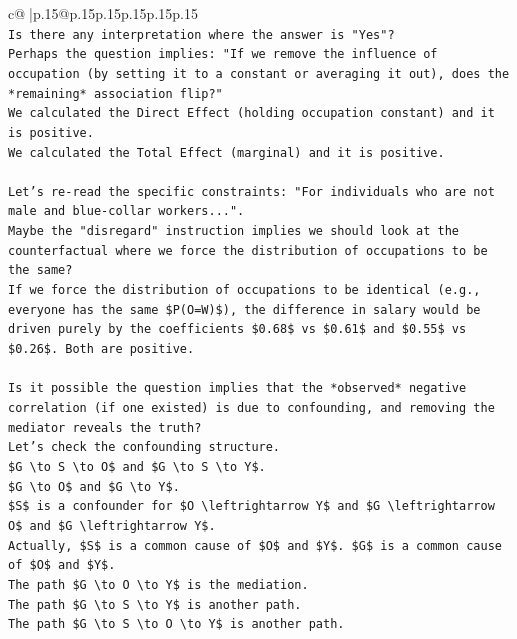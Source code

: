 \documentclass{article}
\begin{document}
{\begin{supertabular}{c@{$\;$}|p{.15\linewidth}@{}p{.15\linewidth}p{.15\linewidth}p{.15\linewidth}p{.15\linewidth}p{.15\linewidth}}
{{{\\ 
\texttt{Is there any interpretation where the answer is "Yes"?} \\
\texttt{Perhaps the question implies: "If we remove the influence of occupation (by setting it to a constant or averaging it out), does the *remaining* association flip?"} \\
\texttt{We calculated the Direct Effect (holding occupation constant) and it is positive.} \\
\texttt{We calculated the Total Effect (marginal) and it is positive.} \\
\\ 
\texttt{Let's re{-}read the specific constraints: "For individuals who are not male and blue{-}collar workers...".} \\
\texttt{Maybe the "disregard" instruction implies we should look at the counterfactual where we force the distribution of occupations to be the same?} \\
\texttt{If we force the distribution of occupations to be identical (e.g., everyone has the same \$P(O=W)\$), the difference in salary would be driven purely by the coefficients \$0.68\$ vs \$0.61\$ and \$0.55\$ vs \$0.26\$. Both are positive.} \\
\\ 
\texttt{Is it possible the question implies that the *observed* negative correlation (if one existed) is due to confounding, and removing the mediator reveals the truth?} \\
\texttt{Let's check the confounding structure.} \\
\texttt{\$G \textbackslash{}to S \textbackslash{}to O\$ and \$G \textbackslash{}to S \textbackslash{}to Y\$.} \\
\texttt{\$G \textbackslash{}to O\$ and \$G \textbackslash{}to Y\$.} \\
\texttt{\$S\$ is a confounder for \$O \textbackslash{}leftrightarrow Y\$ and \$G \textbackslash{}leftrightarrow O\$ and \$G \textbackslash{}leftrightarrow Y\$.} \\
\texttt{Actually, \$S\$ is a common cause of \$O\$ and \$Y\$. \$G\$ is a common cause of \$O\$ and \$Y\$.} \\
\texttt{The path \$G \textbackslash{}to O \textbackslash{}to Y\$ is the mediation.} \\
\texttt{The path \$G \textbackslash{}to S \textbackslash{}to Y\$ is another path.} \\
\texttt{The path \$G \textbackslash{}to S \textbackslash{}to O \textbackslash{}to Y\$ is another path.} \\
}}}
\end{supertabular}}
\end{document}
